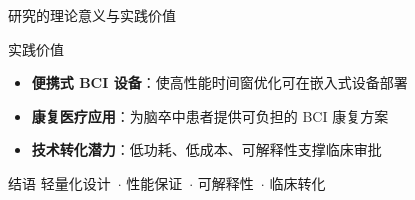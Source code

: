 {\begin{frame}{研究的理论意义与实践价值}
    \begin{block}{实践价值}
        \begin{itemize}
            \item \textbf{便携式 BCI 设备}：使高性能时间窗优化可在嵌入式设备部署
            \item \textbf{康复医疗应用}：为脑卒中患者提供可负担的 BCI 康复方案
            \item \textbf{技术转化潜力}：低功耗、低成本、可解释性支撑临床审批
        \end{itemize}
    \end{block}

    \begin{block}{结语}
        \centering
        \large
        轻量化设计~$\cdot$ 性能保证~$\cdot$ 可解释性~$\cdot$ 临床转化
    \end{block}
\end{frame}

} %
